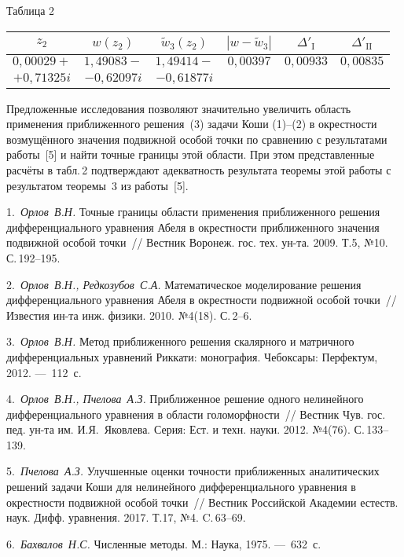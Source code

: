 \begin{table}[tb]
\footnotesize

{\raggedleft Таблица 2

}

\smallskip

{\tabcolsep=2.1mm


\bigskip

\begin{tabular}{|c|c|c|c|c|c|}
\hline
 $z_{2}$&$w(z_{2})$&$\tilde w_{3}(z_{2})$&$|w-\tilde w_{3}|$&$\Delta'_{\mathrm{I}}$&$\Delta'_{\mathrm{II}}$\\
\hline
 $0,00029+$&$1,49083-$&$1,49414-$&$0,00397$&$0,00933$&$0,00835$\\
 $+0,71325i$&$-0,62097i$&$-0,61877i$&&&\\
\hline
\end{tabular}

}
\end{table}

Предложенные исследования позволяют значительно увеличить область применения приближенного решения~(3) задачи
Коши (1)--(2) в окрестности возмущённого значения подвижной особой точки по сравнению с результатами
работы~[5] и найти точные границы этой области. При этом представленные расчёты в табл.\,2 подтверждают
адекватность результата теоремы этой работы с результатом теоремы~3 из работы~[5].

\litlist

1.~{\it Орлов~В.Н.} Точные границы области применения приближенного решения дифференциального уравнения Абеля
в окрестности приближенного значения подвижной особой точки~// Вестник Воронеж. гос. тех. ун-та. 2009. Т.5,
№10. С.\,192--195.

2.~{\it Орлов~В.Н., Редкозубов~С.А.} Математическое моделирование решения дифференциального уравнения Абеля в
окрестности подвижной особой точки~// Известия ин-та инж. физики. 2010. №4(18). С.\,2--6.

3.~{\it Орлов~В.Н.} Метод приближенного решения скалярного и матричного дифференциальных уравнений Риккати:
монография. Чебоксары: Перфектум, 2012. ---~112~с.

4.~{\it Орлов~В.Н., Пчелова~А.З.} Приближенное решение одного нелинейного дифференциального уравнения в
области голоморфности~// Вестник Чув. гос. пед. ун-та им. И.Я.~Яковлева. Серия: Ест. и техн. науки. 2012.
№4(76). С.\,133--139.

5.~{\it Пчелова~А.З.} Улучшенные оценки точности приближенных аналитических решений задачи Коши для
нелинейного дифференциального уравнения в окрестности подвижной особой точки~// Вестник Российской Академии
естеств. наук. Дифф. уравнения. 2017. Т.17, №4. C.\,63--69.

6.~{\it Бахвалов~Н.С.} Численные методы. М.: Наука, 1975. ---~632~с.

